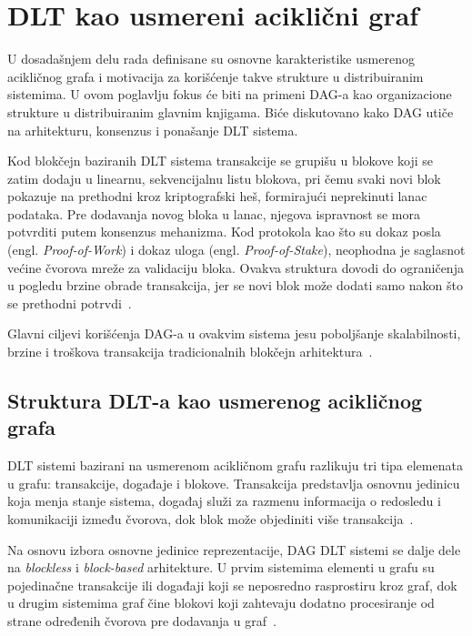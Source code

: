 \section{DLT kao usmereni aciklični graf}

U dosadašnjem delu rada definisane su osnovne karakteristike usmerenog acikličnog grafa i motivacija za korišćenje takve strukture u distribuiranim sistemima. U ovom poglavlju fokus će biti na primeni DAG-a kao organizacione strukture u distribuiranim glavnim knjigama. Biće diskutovano kako DAG utiče na arhitekturu, konsenzus i ponašanje DLT sistema.

Kod blokčejn baziranih DLT sistema transakcije se grupišu u blokove koji se zatim dodaju u linearnu, sekvencijalnu listu blokova, pri čemu svaki novi blok pokazuje na prethodni kroz kriptografski heš, formirajući neprekinuti lanac podataka. Pre dodavanja novog bloka u lanac, njegova ispravnost se mora potvrditi putem konsenzus mehanizma. Kod protokola kao što su dokaz posla (engl. \textit{Proof-of-Work}) i dokaz uloga (engl. \textit{Proof-of-Stake}), neophodna je saglasnot većine čvorova mreže za validaciju bloka. Ovakva struktura dovodi do ograničenja u pogledu brzine obrade transakcija, jer se novi blok može dodati samo nakon što se prethodni potrvdi~\cite{university mitosis blockchain vs blockDAG}.

Glavni ciljevi korišćenja DAG-a u ovakvim sistema jesu poboljšanje skalabilnosti, brzine i troškova transakcija tradicionalnih blokčejn arhitektura~\cite{blockchain council role of DAG}.

\subsection{Struktura DLT-a kao usmerenog acikličnog grafa}

DLT sistemi bazirani na usmerenom acikličnom grafu razlikuju tri tipa elemenata u grafu: transakcije, događaje i blokove. Transakcija predstavlja osnovnu jedinicu koja menja stanje sistema, događaj služi za razmenu informacija o redosledu i komunikaciji između čvorova, dok blok može objediniti više transakcija~\cite{DAG in Smart Mobility}.

Na osnovu izbora osnovne jedinice reprezentacije, DAG DLT sistemi se dalje dele na \textit{blockless} i \textit{block-based} arhitekture. U prvim sistemima elementi u grafu su pojedinačne transakcije ili događaji koji se neposredno rasprostiru kroz graf, dok u drugim sistemima graf čine blokovi koji zahtevaju dodatno procesiranje od strane određenih čvorova pre dodavanja u graf~\cite{DAG in Smart Mobility}.

